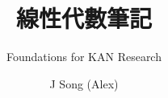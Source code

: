 \documentclass[
	a4paper, %
	fontsize=10pt, %
	twoside=true, %
	open=any, %
	titlepage=false, %
	numbers=noenddot, %
]{kaobook}
\begin{document}

\subject{KAN Research Preparation Notes}

\title[線性代數筆記]{線性代數筆記}
\subtitle{Foundations for KAN Research}

\author[J Song (Alex)]{J Song (Alex)}

\date{}



\frontmatter %




%
%	
%	
%	
%	
%	
%	
%	
%	
%	
\end{document}
